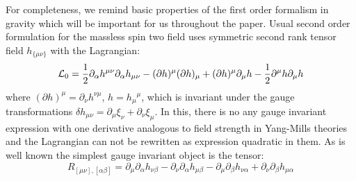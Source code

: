 \documentclass[a4paper,12pt]{article}
\begin{document}
For completeness, we remind basic properties of the first order
formalism in gravity which will be important for us throughout the
paper. Usual second order formulation for the massless spin two field
uses symmetric second rank tensor field $h_{\{\mu\nu\}}$ with the
Lagrangian:
\begin{equation}
{\cal L}_0 = \frac{1}{2} \partial_\alpha h^{\mu\nu} \partial_\alpha
h_{\mu\nu} - (\partial h)^\mu (\partial h)_\mu + (\partial h)^\mu
\partial_\mu h - \frac{1}{2} \partial^\mu h \partial_\mu h
\end{equation}
where $(\partial h)^\mu = \partial_\nu h^{\nu\mu}$, $h = h_\mu{}^\mu$,
which is invariant under the gauge transformations
$\delta h_{\mu\nu} = \partial_\mu \xi_\nu + \partial_\nu \xi_\mu$.
In this, there is no any gauge invariant expression with one
derivative analogous to field strength in Yang-Mills theories and the
Lagrangian can not be rewritten as expression quadratic in them.
As is well known the simplest gauge invariant object is the tensor:
$$
R_{[\mu\nu],[\alpha\beta]} = \partial_\mu \partial_\alpha h_{\nu\beta}
- \partial_\nu \partial_\alpha h_{\mu\beta} - \partial_\mu
\partial_\beta h_{\nu\alpha} + \partial_\nu \partial_\beta
h_{\mu\alpha}
$$
\end{document}

